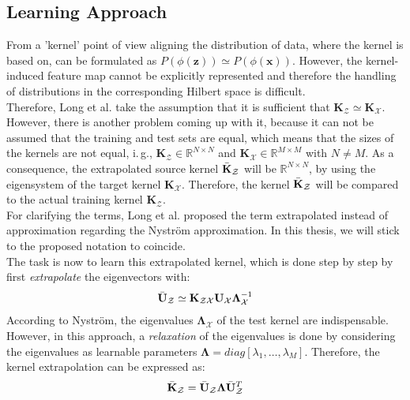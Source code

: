 \subsection{Learning Approach}\label{InSubSecLearnApp}
From a 'kernel' point of view aligning the distribution of data, where the kernel is based on, can be formulated as $P(\phi(\mathbf{z})) \simeq P(\phi(\mathbf{x}))$.\cite{Long.2015}
However, the kernel-induced feature map cannot be explicitly represented and therefore the handling of distributions in the corresponding Hilbert space is difficult.\cite{KaiZhang.2013}\\
Therefore, Long et al. take the assumption that it is sufficient that $\mathbf{K}_\mathcal{Z} \simeq \mathbf{K}_\mathcal{X}$.
However, there is another problem coming up with it, because it can not be assumed that the training and test sets are equal, which means that the sizes of the kernels are not equal, i.\,g., $\mathbf{K}_\mathcal{Z} \in \mathbb{R}^{N\times N}$ and $\mathbf{K}_\mathcal{X} \in \mathbb{R}^{M\times M}$ with $N \neq M$.
As a consequence, the extrapolated source kernel $\bar{\mathbf{K}}_\mathcal{Z}$ will be $\mathbb{R}^{N\times N}$, by using the eigensystem of the target kernel $\mathbf{K}_\mathcal{X}$. Therefore, the kernel  $\bar{\mathbf{K}}_\mathcal{Z} $ will be compared to the actual training kernel $\mathbf{K}_\mathcal{Z}$.\cite{Long.2015}\\
For clarifying the terms, Long et al. proposed the term extrapolated instead of approximation regarding the Nyström approximation.\cite{Long.2015}
In this thesis, we will stick to the proposed notation to coincide.\\
The task is now to learn this extrapolated kernel, which is done step by step by first \textit{extrapolate} the eigenvectors with:\cite{Long.2015}
\begin{equation}\label{EqExtraEigs}
	\bar{\mathbf{U}}_\mathcal{Z} \simeq \mathbf{K}_\mathcal{ZX}\mathbf{U}_\mathcal{X} \boldsymbol{\Lambda}_\mathcal{X}^{-1}
\end{equation}
According to Nyström, the eigenvalues $\boldsymbol{\Lambda}_\mathcal{X}$ of the test kernel are indispensable.
However, in this approach, a \textit{relaxation} of the eigenvalues is done by considering the eigenvalues as learnable parameters $\boldsymbol{\Lambda} = diag[\lambda_1,\dots,\lambda_{M}]$.
Therefore, the kernel extrapolation can be expressed as:\cite{Long.2015}
\begin{equation}
	\bar{\mathbf{K}}_\mathcal{Z} = \bar{\mathbf{U}}_\mathcal{Z} \boldsymbol{\Lambda} \bar{\mathbf{U}}_\mathcal{Z}^T
\end{equation}
